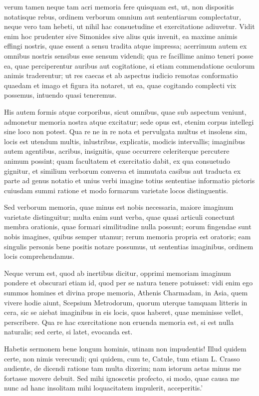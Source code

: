  verum tamen neque tam acri memoria fere quisquam est, ut, non dispositis notatisque rebus, ordinem verborum omnium aut sententiarum complectatur, neque vero tam hebeti, ut nihil hac consuetudine et exercitatione adiuvetur. Vidit enim hoc prudenter sive Simonides sive alius quis invenit, ea maxime animis effingi nostris, quae essent a sensu tradita atque impressa; acerrimum autem ex omnibus nostris sensibus esse sensum videndi; qua re facillime animo teneri posse ea, quae perciperentur auribus aut cogitatione, si etiam commendatione oculorum animis traderentur; ut res caecas et ab aspectus iudicio remotas conformatio quaedam et imago et figura ita notaret, ut ea, quae cogitando complecti vix possemus, intuendo quasi teneremus.

 His autem formis atque corporibus, sicut omnibus, quae sub aspectum veniunt, admonetur memoria nostra atque excitatur; sede opus est, etenim corpus intellegi sine loco non potest. Qua re ne in re nota et pervulgata multus et insolens sim, locis est utendum multis, inlustribus, explicatis, modicis intervallis; imaginibus autem agentibus, acribus, insignitis, quae occurrere celeriterque percutere animum possint; quam facultatem et exercitatio dabit, ex qua consuetudo gignitur, et similium verborum conversa et immutata casibus aut traducta ex parte ad genus notatio et unius verbi imagine totius sententiae informatio pictoris cuiusdam summi ratione et modo formarum varietate locos distinguentis.

 Sed verborum memoria, quae minus est nobis necessaria, maiore imaginum varietate distinguitur; multa enim sunt verba, quae quasi articuli conectunt membra orationis, quae formari similitudine nulla possunt; eorum fingendae sunt nobis imagines, quibus semper utamur; rerum memoria propria est oratoris; eam singulis personis bene positis notare possumus, ut sententias imaginibus, ordinem locis comprehendamus.

 Neque verum est, quod ab inertibus dicitur, opprimi memoriam imaginum pondere et obscurari etiam id, quod per se natura tenere potuisset: vidi enim ego summos homines et divina prope memoria, Athenis Charmadam, in Asia, quem vivere hodie aiunt, Scepsium Metrodorum, quorum uterque tamquam litteris in cera, sic se aiebat imaginibus in eis locis, quos haberet, quae meminisse vellet, perscribere. Qua re hac exercitatione non eruenda memoria est, si est nulla naturalis; sed certe, si latet, evocanda est.

 Habetis sermonem bene longum hominis, utinam non impudentis! Illud quidem certe, non nimis verecundi; qui quidem, cum te, Catule, tum etiam L. Crasso audiente, de dicendi ratione tam multa dixerim; nam istorum aetas minus me fortasse movere debuit. Sed mihi ignoscetis profecto, si modo, quae causa me nunc ad hanc insolitam mihi loquacitatem impulerit, acceperitis.'

